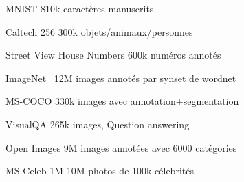 \begin{frame}{MNIST}
  810k caractères manuscrits
\end{frame}

\begin{frame}{Caltech 256}
  300k objets/animaux/personnes
\end{frame}

\begin{frame}{Street View House Numbers}
  600k numéros annotés
\end{frame}

\begin{frame}{ImageNet}
  ~12M images annotés par synset de wordnet
\end{frame}

\begin{frame}{MS-COCO}
   330k images avec annotation+segmentation
\end{frame}

\begin{frame}{VisualQA}
  265k images, Question answering
\end{frame}

\begin{frame}{Open Images}
  9M images annotées avec 6000 catégories
\end{frame}

\begin{frame}{MS-Celeb-1M}
  10M photos de 100k célebrités
\end{frame}
